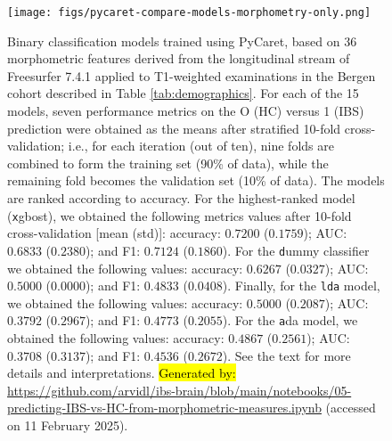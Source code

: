 \documentclass[diagnostics,article,accept,pdftex,moreauthors]{Definitions/mdpi}
\begin{document}
\begin{figure}[H]
\texttt{[image: figs/pycaret-compare-models-morphometry-only.png]}
\caption{{{Binary classification models trained using PyCaret}}, {based on 36 morphometric} 
features derived from the longitudinal stream of Freesurfer 7.4.1 applied to T1-weighted examinations in the Bergen cohort described in Table \ref{tab:demographics}. For each of the 15 models, seven performance metrics on the O (HC) versus 1 (IBS) prediction were obtained as the means after stratified 10-fold cross-validation; i.e., for each iteration (out of ten), nine folds are combined to form the training set (90\% of data), while the remaining fold becomes the validation set (10\% of data). The models are ranked according to accuracy. {For the highest-ranked model ({\texttt xgbost}), we obtained the following metrics values after 10-fold cross-validation [mean (std)]: accuracy:  $0.7200$ ($0.1759$); AUC: $0.6833$ ($0.2380$); and F1: $0.7124$ ($0.1860$). For the {\texttt dummy} classifier we obtained the following values: accuracy: $0.6267$ ($0.0327$); AUC: $0.5000$ ($0.0000$); and F1: $0.4833$ ($0.0408$). Finally, for the \texttt{lda} model, we obtained the following values: accuracy: $0.5000$ ($0.2087$); AUC: $0.3792$ ($0.2967$); and F1: $0.4773$ ($0.2055$). For the {\texttt ada} model, we obtained the following values: accuracy: $0.4867$ ($0.2561$); AUC: $0.3708$ ($0.3137$); and F1: $0.4536$ ($0.2672$)}. {See the text for more details and interpretations.} 
{\hl{Generated by: }{{\url{https://github.com/arvidl/ibs-brain/blob/main/notebooks/05-predicting-IBS-vs-HC-from-morphometric-measures.ipynb}}}} (accessed on 11 February 2025).}
\label{A-fig:models-trained}
\end{figure}
\end{document}
